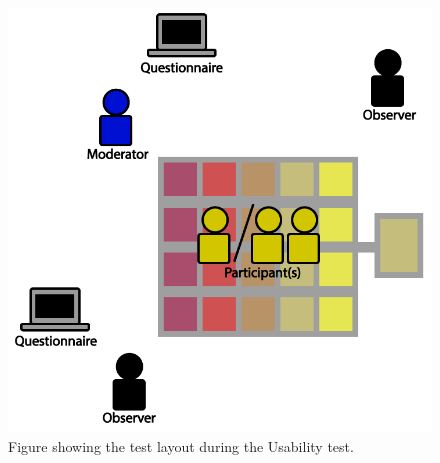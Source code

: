 \begin{figure}[H]
	\centering
	\includegraphics[width=0.7\linewidth]{figure/Design/usability}
	\caption{Figure showing the test layout during the Usability test.}	
	\label{fig:usabilityTest}
\end{figure}

